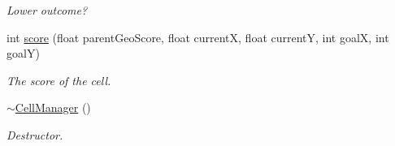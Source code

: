 \begin{DoxyCompactItemize}
\begin{DoxyCompactList}\small\item\em Lower outcome? \end{DoxyCompactList}\item 
int \mbox{\hyperlink{class_cell_manager_a6243c6c1c190fb440a5b6a0630999307}{score}} (float parent\+Geo\+Score, float currentX, float currentY, int goalX, int goalY)
\begin{DoxyCompactList}\small\item\em The score of the cell. \end{DoxyCompactList}\item 
\mbox{\label{class_cell_manager_a1deabd7112ec2f07c08180afbf7fb44d}} 
\mbox{\hyperlink{class_cell_manager_a1deabd7112ec2f07c08180afbf7fb44d}{$\sim$\+Cell\+Manager}} ()
\begin{DoxyCompactList}\small\item\em Destructor. \end{DoxyCompactList}\end{DoxyCompactItemize}
